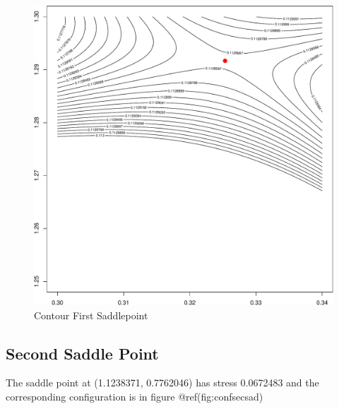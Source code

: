 \documentclass[
  12pt,
  letterpaper,
  DIV=11,
  numbers=noendperiod]{scrreprt}
\theoremstyle{remark}
\begin{document}
\begin{figure}[H]

{\centering \includegraphics{spaces_files/figure-pdf/contfirstsad-1.pdf}

}

\caption{Contour First Saddlepoint}

\end{figure}%

\subsection{Second Saddle Point}\label{second-saddle-point}

The saddle point at (1.1238371, 0.7762046) has stress 0.0672483 and the
corresponding configuration is in figure @ref(fig:confsecsad)
\end{document}

